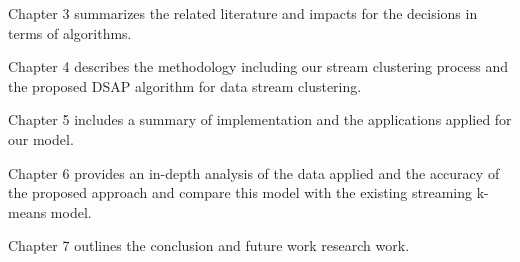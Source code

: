 Chapter 3 summarizes the related literature and impacts for the decisions in terms of algorithms.

Chapter 4 describes the methodology including our stream clustering process and the proposed DSAP algorithm for data stream clustering.

Chapter 5 includes a summary of implementation and the applications applied for our model.

Chapter 6 provides an in-depth analysis of the data applied and the accuracy of the proposed approach and compare this model with the existing streaming k-means model.

Chapter 7 outlines the conclusion and future work research work.
% 









